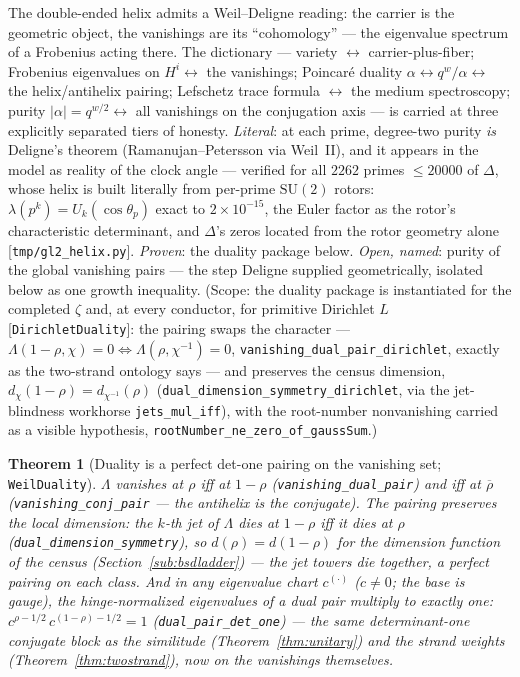 \documentclass[11pt]{article}
\newtheorem{theorem}[definition]{Theorem}
\newcommand{\conj}[1]{\overline{#1}}
\newcommand{\code}[1]{\texttt{#1}}
\begin{document}
The double-ended helix admits a Weil--Deligne reading: the carrier is the geometric object, the
vanishings are its ``cohomology'' --- the eigenvalue spectrum of a Frobenius acting there.  The
dictionary --- variety $\leftrightarrow$ carrier-plus-fiber; Frobenius eigenvalues on
$H^i\leftrightarrow$ the vanishings; Poincar\'e duality $\alpha\leftrightarrow q^w/\alpha
\leftrightarrow$ the helix/antihelix pairing; Lefschetz trace formula $\leftrightarrow$ the medium
spectroscopy; purity $|\alpha|=q^{w/2}\leftrightarrow$ all vanishings on the conjugation axis --- is carried
at three explicitly separated tiers of honesty.  \emph{Literal}: at each prime, degree-two purity
\emph{is} Deligne's theorem (Ramanujan--Petersson via Weil~II), and it appears in the model as
reality of the clock angle --- verified for all $2262$ primes $\le20000$ of $\Delta$, whose helix
is built literally from per-prime $\mathrm{SU}(2)$ rotors: $\lambda(p^k)=U_k(\cos\theta_p)$ exact
to $2\times10^{-15}$, the Euler factor as the rotor's characteristic determinant, and $\Delta$'s
zeros located from the rotor geometry alone [\code{tmp/gl2\_helix.py}].  \emph{Proven}: the
duality package below.  \emph{Open, named}: purity of the global vanishing pairs --- the step
Deligne supplied geometrically, isolated below as one growth inequality.  (Scope: the duality package is instantiated for the completed $\zeta$ and, at every conductor,
for primitive Dirichlet $L$ [\code{DirichletDuality}]: the pairing swaps the character ---
$\Lambda(1-\rho,\chi)=0\iff\Lambda(\rho,\chi^{-1})=0$, \code{vanishing\_dual\_pair\_dirichlet},
exactly as the two-strand ontology says --- and preserves the census dimension,
$d_\chi(1-\rho)=d_{\chi^{-1}}(\rho)$ (\code{dual\_dimension\_symmetry\_dirichlet}, via the
jet-blindness workhorse \code{jets\_mul\_iff}), with the root-number nonvanishing carried as a
visible hypothesis, \code{rootNumber\_ne\_zero\_of\_gaussSum}.)

\begin{theorem}[Duality is a perfect det-one pairing on the vanishing set; \code{WeilDuality}]\label{thm:dualpair}
$\Lambda$ vanishes at $\rho$ iff at $1-\rho$ (\code{vanishing\_dual\_pair}) and iff at $\conj\rho$
(\code{vanishing\_conj\_pair} --- the antihelix is the conjugate).  The pairing preserves the
local dimension: the $k$-th jet of $\Lambda$ dies at $1-\rho$ iff it dies at $\rho$
(\code{dual\_dimension\_symmetry}), so $d(\rho)=d(1-\rho)$ for the dimension function of the
census (Section~\ref{sub:bsdladder}) --- the jet towers die together, a perfect pairing on each
class.  And in any eigenvalue chart $c^{(\cdot)}$ ($c\neq0$; the base is gauge), the
hinge-normalized eigenvalues of a dual pair multiply to exactly one:
$c^{\rho-1/2}\,c^{(1-\rho)-1/2}=1$ (\code{dual\_pair\_det\_one}) --- the same determinant-one
conjugate block as the similitude (Theorem~\ref{thm:unitary}) and the strand weights
(Theorem~\ref{thm:twostrand}), now on the vanishings themselves.
\end{theorem}
\end{document}
